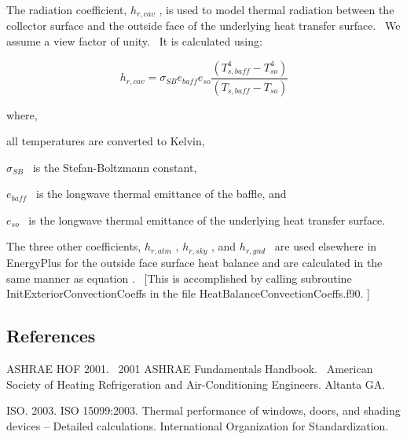 The radiation coefficient, \({h_{r,cav}}\) , is used to model thermal radiation between the collector surface and the outside face of the underlying heat transfer surface.~ We assume a view factor of unity.~ It is calculated using:

\begin{equation}
{h_{r,cav}} = {\sigma_{SB}}{e_{baff}}{e_{so}}\frac{{\left( {T_{s,baff}^4 - T_{so}^4} \right)}}{{\left( {{T_{s,baff}} - {T_{so}}} \right)}}
\end{equation}

where,

all temperatures are converted to Kelvin,

\({\sigma_{SB}}\) ~is the Stefan-Boltzmann constant,

\({e_{baff}}\) ~is the longwave thermal emittance of the baffle, and

\({e_{so}}\) ~is the longwave thermal emittance of the underlying heat transfer surface.

The three other coefficients, \({h_{r,atm}}\) , \({h_{r,sky}}\) , and \({h_{r,gnd}}\) ~are used elsewhere in EnergyPlus for the outside face surface heat balance and are calculated in the same manner as equation .~ {[}This is accomplished by calling subroutine InitExteriorConvectionCoeffs in the file HeatBalanceConvectionCoeffs.f90. {]}

\subsection{References}\label{references-023}

ASHRAE HOF 2001.~ 2001 ASHRAE Fundamentals Handbook.~ American Society of Heating Refrigeration and Air-Conditioning Engineers. Altanta GA.

ISO. 2003. ISO 15099:2003. Thermal performance of windows, doors, and shading devices -- Detailed calculations. International Organization for Standardization.
